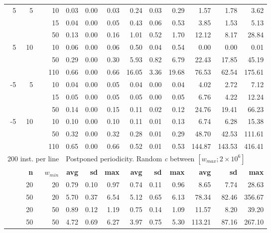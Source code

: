 \begin{table}
\begin{tabular}{@{\extracolsep{4pt}}rrrrrrrrrrrr@{}}
\cline{1-3}\cline{4-6}\cline{7-9}\cline{10-12}
 5 & 5  & 10 & 0.03 & 0.00 & 0.03 &  0.24 & 0.03 &  0.29 & 1.57 & 1.78 & 3.62\\
   &    & 15 & 0.04 & 0.00 & 0.05 &  0.43 & 0.06 &  0.53 & 3.85 & 1.53 & 5.13\\
   &    & 50 & 0.13 & 0.00 & 0.16 &  1.01 & 0.52 &  1.70 & 12.12 & 8.17 & 28.84\\
 5 & 10 & 10 & 0.06 & 0.00 & 0.06 &  0.50 & 0.04 &  0.54 & 0.00 & 0.00 & 0.01\\
   &    & 50 & 0.29 & 0.00 & 0.30 &  5.93 & 0.82 &  6.79 & 22.43 & 17.85 & 45.19\\
   &    & 110& 0.66 & 0.00 & 0.66 & 16.05 & 3.36 & 19.68 & 76.53 & 62.54 & 175.61\\
-5 & 5  & 10 & 0.04 & 0.00 & 0.05 & 0.04 & 0.00 & 0.04 & 4.02 & 2.72 & 7.12\\
   &    & 15 & 0.05 & 0.00 & 0.05 & 0.05 & 0.00 & 0.05 & 6.76 & 4.22 & 12.24\\
   &    & 50 & 0.14 & 0.00 & 0.15 & 0.11 & 0.02 & 0.12 & 24.76 & 19.41 & 66.23\\
-5 & 10 & 10 & 0.10 & 0.00 & 0.10 & 0.11 & 0.01 & 0.13 & 6.74 & 6.28 & 15.38\\
   &    & 50 & 0.32 & 0.00 & 0.32 & 0.28 & 0.01 & 0.29 & 48.70 & 42.53 & 111.61\\
   &    & 110& 0.65 & 0.00 & 0.66 & 0.52 & 0.01 & 0.53 & 144.87 & 143.53 & 416.41\\
\hline

\multicolumn{3}{l}{200 inst. per line} & \multicolumn{9}{l}{Postponed periodicity. Random \emph{c} between \([w_{max}; 2\times10^6]\)}\\
\cline{1-3}\cline{4-12}
& \textbf{n} & \(w_{min}\) & \textbf{avg} & \textbf{sd} & \textbf{max} & \textbf{avg} & \textbf{sd} & \textbf{max} & \textbf{avg} & \textbf{sd} & \textbf{max}\\
\cline{1-3}\cline{4-6}\cline{7-9}\cline{10-12}
& 20 & 20 & 0.79 & 0.10 & 0.97 & 0.74 & 0.11 & 0.96 & 8.65 & 7.74 & 28.63\\
& 50 & 20 & 5.70 & 0.37 & 6.54 & 5.12 & 0.65 & 6.13 & 78.34 & 82.46 & 356.67\\
& 20 & 50 & 0.89 & 0.12 & 1.19 & 0.75 & 0.14 & 1.09 & 11.57 & 8.20 & 39.20\\
& 50 & 50 & 4.72 & 0.69 & 6.27 & 3.97 & 0.75 & 5.30 & 113.21 & 87.16 & 267.10\\
\hline


\end{tabular}
\end{table}
